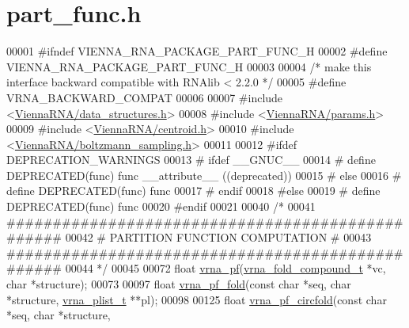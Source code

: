\hypertarget{part__func_8h_source}{}\section{part\+\_\+func.\+h}
\label{part__func_8h_source}

\begin{DoxyCode}
00001 \textcolor{preprocessor}{#ifndef VIENNA\_RNA\_PACKAGE\_PART\_FUNC\_H}
00002 \textcolor{preprocessor}{#define VIENNA\_RNA\_PACKAGE\_PART\_FUNC\_H}
00003 
00004 \textcolor{comment}{/* make this interface backward compatible with RNAlib < 2.2.0 */}
00005 \textcolor{preprocessor}{#define VRNA\_BACKWARD\_COMPAT}
00006 
00007 \textcolor{preprocessor}{#include <\hyperlink{data__structures_8h}{ViennaRNA/data\_structures.h}>}
00008 \textcolor{preprocessor}{#include <\hyperlink{params_8h}{ViennaRNA/params.h}>}
00009 \textcolor{preprocessor}{#include <\hyperlink{centroid_8h}{ViennaRNA/centroid.h}>}
00010 \textcolor{preprocessor}{#include <\hyperlink{boltzmann__sampling_8h}{ViennaRNA/boltzmann\_sampling.h}>}
00011 
00012 \textcolor{preprocessor}{#ifdef DEPRECATION\_WARNINGS}
00013 \textcolor{preprocessor}{# ifdef \_\_GNUC\_\_}
00014 \textcolor{preprocessor}{#  define DEPRECATED(func) func \_\_attribute\_\_ ((deprecated))}
00015 \textcolor{preprocessor}{# else}
00016 \textcolor{preprocessor}{#  define DEPRECATED(func) func}
00017 \textcolor{preprocessor}{# endif}
00018 \textcolor{preprocessor}{#else}
00019 \textcolor{preprocessor}{# define DEPRECATED(func) func}
00020 \textcolor{preprocessor}{#endif}
00021 
00040 \textcolor{comment}{/*}
00041 \textcolor{comment}{#################################################}
00042 \textcolor{comment}{# PARTITION FUNCTION COMPUTATION                #}
00043 \textcolor{comment}{#################################################}
00044 \textcolor{comment}{*/}
00045 
00072 \textcolor{keywordtype}{float} \hyperlink{group__pf__fold_ga29e256d688ad221b78d37f427e0e99bc}{vrna\_pf}(\hyperlink{group__fold__compound_structvrna__fc__s}{vrna\_fold\_compound\_t} *vc, \textcolor{keywordtype}{char} *structure);
00073 
00097 \textcolor{keywordtype}{float} \hyperlink{group__pf__fold_ga59935ba485ac90f0efb5a38e2962d879}{vrna\_pf\_fold}(\textcolor{keyword}{const} \textcolor{keywordtype}{char} *seq, \textcolor{keywordtype}{char} *structure, \hyperlink{group__data__structures_structvrna__plist__s}{vrna\_plist\_t} **pl);
00098 
00125 \textcolor{keywordtype}{float} \hyperlink{group__pf__fold_ga6dc133fce577fc0370986f3a3301cd10}{vrna\_pf\_circfold}(\textcolor{keyword}{const} \textcolor{keywordtype}{char} *seq, \textcolor{keywordtype}{char} *structure, 

\end{DoxyCode}
